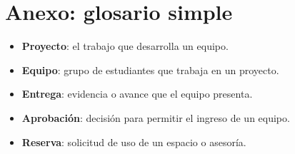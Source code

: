 \documentclass[12pt]{article}
\begin{document}
\section{Anexo: glosario simple}
\begin{itemize}
  \item \textbf{Proyecto}: el trabajo que desarrolla un equipo.
  \item \textbf{Equipo}: grupo de estudiantes que trabaja en un proyecto.
  \item \textbf{Entrega}: evidencia o avance que el equipo presenta.
  \item \textbf{Aprobación}: decisión para permitir el ingreso de un equipo.
  \item \textbf{Reserva}: solicitud de uso de un espacio o asesoría.
\end{itemize}
\end{document}
